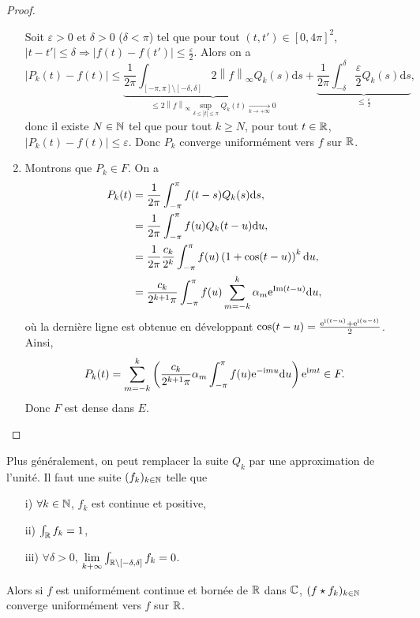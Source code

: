 \documentclass[12pt]{article}
\begin{document}
\begin{proof}
\begin{enumerate}
        Soit $\varepsilon>0$ et $\delta>0$ ($\delta<\pi$) tel que pour tout $(t,t')\in[0,4\pi]^{2}$, $\left\lvert t-t'\right\rvert\leqslant\delta\Rightarrow\left\lvert f(t)-f(t')\right\rvert\leqslant\frac{\varepsilon}{2}$. Alors on a 
        \begin{equation*}
            \left\lvert P_{k}(t)-f(t)\right\rvert\leqslant\underbrace{\frac{1}{2\pi}\int_{[-\pi,\pi]\setminus[-\delta,\delta]}2\left\lVert f\right\rVert_{\infty}Q_{k}(s)\mathrm{d}s}_{\leqslant2\left\lVert f\right\rVert_{\infty}\sup\limits_{\delta\leqslant\left\lvert t\right\rvert \leqslant\pi}Q_{k}(t)\xrightarrow[k\to+\infty]{}0}+\underbrace{\frac{1}{2\pi}\int_{-\delta}^{\delta}\frac{\varepsilon}{2}Q_{k}(s)\mathrm{d}s}_{\leqslant\frac{\varepsilon}{2}},
        \end{equation*}
        donc il existe $N\in\mathbb{N}$ tel que pour tout $k\geqslant N$, pour tout $t\in\mathbb{R}$, $\left\lvert P_{k}(t)-f(t)\right\rvert\leqslant\varepsilon$. Donc $P_{k}$ converge uniformément vers $f$ sur $\mathbb{R}$.

        \item Montrons que $P_{k}\in F$. On a 
        \begin{align*}
            P_{k}(t)
            &=\frac{1}{2\pi}\int_{-\pi}^{\pi}f(t-s)Q_{k}(s)\mathrm{d}s,\\
            &=\frac{1}{2\pi}\int_{-\pi}^{\pi}f(u)Q_{k}(t-u)\mathrm{d}u,\\
            &=\frac{1}{2\pi}\frac{c_{k}}{2^{k}}\int_{-\pi}^{\pi}f(u)\left(1+\cos(t-u)\right)^{k}\mathrm{d}u,\\
            &=\frac{c_{k}}{2^{k+1}\pi}\int_{-\pi}^{\pi}f(u)\sum_{m=-k}^{k}\alpha_{m}\mathrm{e}^{\mathrm{Im}(t-u)}\mathrm{d}u,
        \end{align*}
        où la dernière ligne est obtenue en développant $\cos(t-u)=\frac{\mathrm{e}^{\mathrm{i}(t-u)}+\mathrm{e}^{\mathrm{i}(u-t)}}{2}$.
        Ainsi, 
        \begin{equation*}
            P_{k}(t)=\sum_{m=-k}^{k}\left(\frac{c_{k}}{2^{k+1}\pi}\alpha_{m}\int_{-\pi}^{\pi}f(u)\mathrm{e}^{-\mathrm{i} mu}\mathrm{d}u\right)\mathrm{e}^{\mathrm{i} mt}\in F.
        \end{equation*}
        Donc $F$ est dense dans $E$.
    \end{enumerate}
\end{proof}

\begin{remark}
    Plus généralement, on peut remplacer la suite $Q_{k}$ par une \og approximation de l'unité\fg. Il faut une suite $(f_{k})_{k\in\mathbb{N}}$ telle que
    \begin{enumerate}
        \item [i)] $\forall k\in\mathbb{N}$, $f_{k}$ est continue et positive,
        \item [ii)] $\int_{\mathbb{R}}f_{k}=1$,
        \item [iii)] $\forall\delta >0$, $\lim\limits_{k+\infty}\int_{\mathbb{R}\setminus[-\delta,\delta]}f_{k}=0$.
    \end{enumerate}
    Alors si $f$ est uniformément continue et bornée de $\mathbb{R}$ dans $\mathbb{C}$, $(f\star f_{k})_{k\in\mathbb{N}}$ converge uniformément vers $f$ sur $\mathbb{R}$.
\end{remark}
\end{document}
